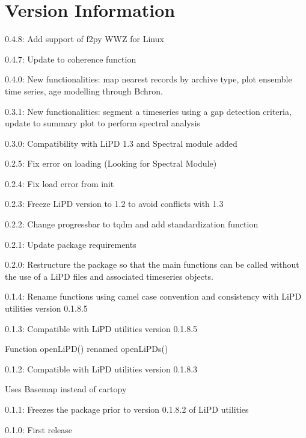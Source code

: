 \documentclass[letterpaper,10pt,english]{sphinxmanual}
\begin{document}
\section{Version Information}
\label{\detokenize{Introduction:version-information}}
\begin{DUlineblock}{0em}
\item[] 0.4.8: Add support of f2py WWZ for Linux
\item[] 0.4.7: Update to coherence function
\item[] 0.4.0: New functionalities: map nearest records by archive type, plot ensemble time series, age modelling through Bchron.
\item[] 0.3.1: New functionalities: segment a timeseries using a gap detection criteria, update to summary plot to perform spectral analysis
\item[] 0.3.0: Compatibility with LiPD 1.3 and Spectral module added
\item[] 0.2.5: Fix error on loading (Looking for Spectral Module)
\item[] 0.2.4: Fix load error from init
\item[] 0.2.3: Freeze LiPD version to 1.2 to avoid conflicts with 1.3
\item[] 0.2.2: Change progressbar to tqdm and add standardization function
\item[] 0.2.1: Update package requirements
\item[] 0.2.0: Restructure the package so that the main functions can be called without the use of a LiPD files and associated timeseries objects.
\item[] 0.1.4: Rename functions using camel case convention and consistency with LiPD utilities version 0.1.8.5
\item[] 0.1.3: Compatible with LiPD utilities version 0.1.8.5
\item[]
\begin{DUlineblock}{\DUlineblockindent}
\item[] Function openLiPD() renamed openLiPDs()
\end{DUlineblock}
\item[] 0.1.2: Compatible with LiPD utilities version 0.1.8.3
\item[]
\begin{DUlineblock}{\DUlineblockindent}
\item[] Uses Basemap instead of cartopy
\end{DUlineblock}
\item[] 0.1.1: Freezes the package prior to version 0.1.8.2 of LiPD utilities
\item[] 0.1.0: First release
\end{DUlineblock}
\end{document}
